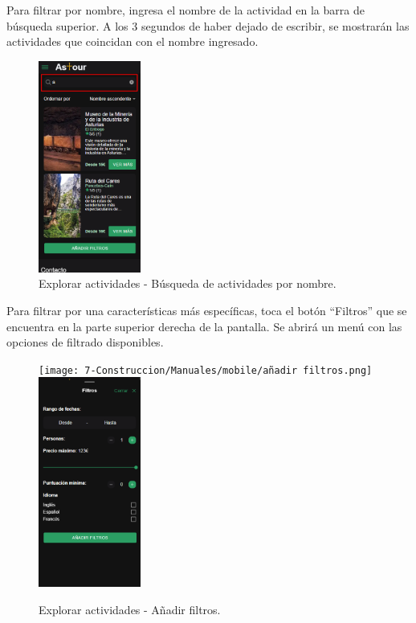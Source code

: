 Para filtrar por nombre, ingresa el nombre de la actividad en la barra de búsqueda superior.
A los 3 segundos de haber dejado de escribir, se mostrarán las actividades que coincidan con el nombre ingresado.
\begin{figure}[H]
	\centering
	\includegraphics[width=0.3\textwidth]{7-Construccion/Manuales/mobile/busqueda por nombre.png}
	\caption{Explorar actividades - Búsqueda de actividades por nombre.}
\end{figure}

Para filtrar por una características más específicas, toca el botón “Filtros” que se encuentra en la parte superior derecha de la pantalla.
Se abrirá un menú con las opciones de filtrado disponibles.
\begin{figure}[H]
	\centering
	\texttt{[image: 7-Construccion/Manuales/mobile/añadir filtros.png]}
	\includegraphics[width=0.3\textwidth]{7-Construccion/Manuales/mobile/menu vacio filtros.png}
	\caption{Explorar actividades - Añadir filtros.}
\end{figure}

